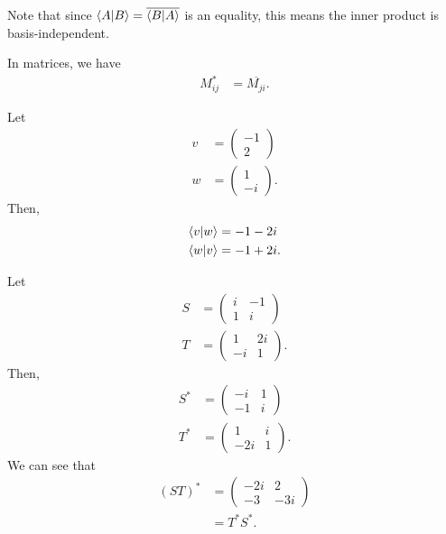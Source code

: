 \documentclass[10pt]{mypackage}
\begin{document}
Note that since $\braket{A}{B} = \overline{\braket{B}{A}}$ is an equality, this means the inner product is basis-independent.\newline

In matrices, we have
\begin{align*}
  M_{ij}^{\ast} &= \overline{M_{ji}}.
\end{align*}
\begin{example}
  Let
  \begin{align*}
    v &= \begin{pmatrix}-1\\2\end{pmatrix}\\
    w &= \begin{pmatrix}1\\-i\end{pmatrix}.
  \end{align*}
  Then,
  \begin{align*}
    \braket{v}{w} &= -1-2i\\
    \braket{w}{v} &= -1+2i.
  \end{align*}
  
\end{example}
\begin{example}
  Let
  \begin{align*}
    S &= \begin{pmatrix}i & -1 \\ 1 & i\end{pmatrix}\\
    T &= \begin{pmatrix}1 & 2i \\ -i & 1\end{pmatrix}.
  \end{align*}
  Then,
  \begin{align*}
    S^{\ast} &= \begin{pmatrix}-i & 1 \\ -1 & i\end{pmatrix}\\
    T^{\ast} &= \begin{pmatrix}1 & i \\ -2i & 1\end{pmatrix}.
  \end{align*}
  We can see that
  \begin{align*}
    \left(ST\right)^{\ast} &= \begin{pmatrix}-2i & 2 \\ -3 & -3i\end{pmatrix}\\
                           &= T^{\ast}S^{\ast}.
  \end{align*}
\end{example}
\end{document}
